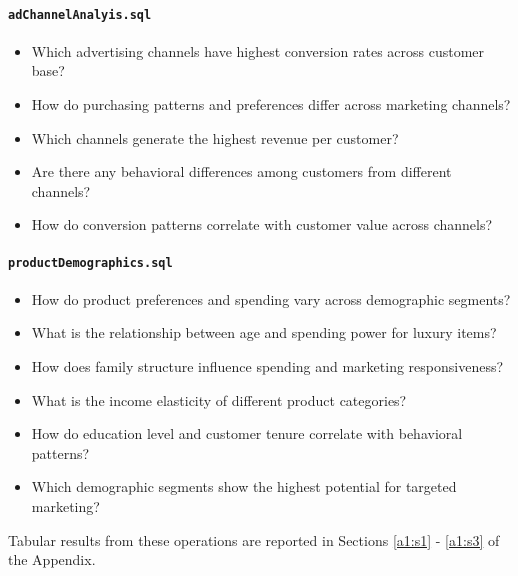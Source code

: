 \documentclass[12pt,a4paper]{article}
\newcommand{\textittt}[1]{\texttt{#1}}
\begin{document}
\paragraph{\textittt{adChannelAnalyis.sql}}
{\footnotesize
\begin{itemize}
    \item Which advertising channels have highest conversion rates across customer base?
    \item How do purchasing patterns and preferences differ across marketing channels?
    \item Which channels generate the highest revenue per customer?
    \item Are there any behavioral differences among customers from different channels?
    \item How do conversion patterns correlate with customer value across channels?
\end{itemize}
}
{\footnotesize
\paragraph{\textittt{productDemographics.sql}}
\begin{itemize}
    \item How do product preferences and spending vary across demographic segments?
    \item What is the relationship between age and spending power for luxury items?
    \item How does family structure influence spending and marketing responsiveness?
    \item What is the income elasticity of different product categories?
    \item How do education level and customer tenure correlate with behavioral patterns?
    \item Which demographic segments show the highest potential for targeted marketing?
\end{itemize}
}
\noindent Tabular results from these operations are reported in Sections \ref{a1:s1} - \ref{a1:s3} of the Appendix.
\end{document}
